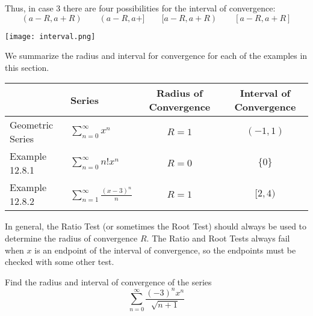   \begin{minipage}{\textwidth}
    Thus, in case 3 there are four possibilities for the interval of convergence:
    $$ (a-R,a+R) \qquad (a-R,a+] \qquad [a-R,a+R) \qquad [a-R,a+R] $$
    \begin{center}
      \texttt{[image: interval.png]}
    \end{center}
  \end{minipage}
  We summarize the radius and interval for convergence for each of the examples in this section.
  \begin{center}
    \bgroup
    \def\arraystretch{3.25}
    \begin{tabular}{ |l|l|c|c| }
     \hline
           & Series & Radius of Convergence & Interval of Convergence \\
      \hline
     Geometric Series & $\displaystyle\sum_{n=0}^{\infty} x^n$ & $R=1$ & $(-1,1)$ \\
     Example 12.8.1 & $\displaystyle\sum_{n=0}^{\infty} n!x^n$ & $R=0$ & $\{0\}$ \\
     Example 12.8.2 & $\displaystyle\sum_{n=1}^{\infty} \frac{(x-3)^n}{n}$ & $R=1$ & $[2,4)$ \\
     \hline
    \end{tabular}
    \egroup
  \end{center}
  In general, the Ratio Test (or sometimes the Root Test) should always be used to determine the radius of convergence $R$. The Ratio and Root Tests always fail when $x$ is an endpoint of the interval of convergence, so the endpoints must be checked with some other test.
  \begin{example}
    Find the radius and interval of convergence of the series
    $$\sum_{n=0}^{\infty} \frac{(-3)^n x^n}{\sqrt{n+1}}$$
  \end{example}
